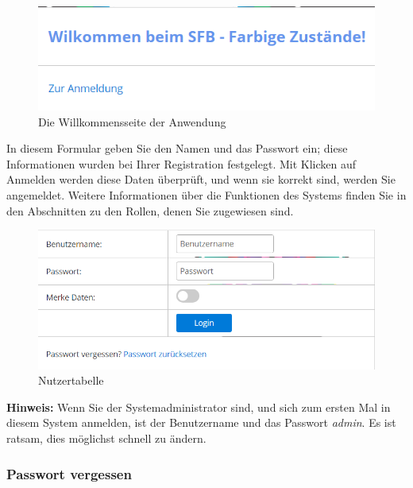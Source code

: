 \documentclass[enabledeprecatedfontcommands,fontsize=12pt,paper=a4,twoside]{scrartcl}
\begin{document}
\begin{figure}[h!]
\begin{center}
 \includegraphics[width=\textwidth]{screenshots/allgemein/willkommen.png}
  \caption{Die Willkommensseite der Anwendung}
  \label{fig:boat1}
\end{center}
\end{figure}

In diesem Formular geben Sie den Namen und das Passwort ein; diese Informationen wurden bei Ihrer Registration festgelegt. Mit Klicken auf Anmelden werden diese Daten überprüft, und wenn sie korrekt sind, werden Sie angemeldet. Weitere Informationen über die Funktionen des Systems finden Sie in den Abschnitten zu den Rollen, denen Sie zugewiesen sind. \\

\begin{figure}[h!]
\begin{center}
 \includegraphics[width=\textwidth]{screenshots/allgemein/login.png}
  \caption{Nutzertabelle}
  \label{fig:boat1}
\end{center}
\end{figure}

\textbf{Hinweis:} Wenn Sie der Systemadministrator sind, und sich zum ersten Mal in diesem System anmelden, ist der Benutzername und das Passwort \textit{admin}. Es ist ratsam, dies möglichst schnell zu ändern. \\


\subsubsection{Passwort vergessen}
\end{document}
